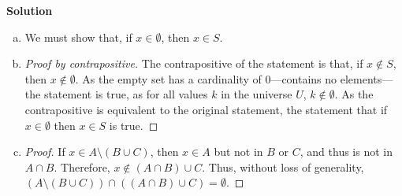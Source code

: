 \documentclass[11pt]{scrartcl}
\theoremstyle{dotlessP}
\theoremstyle{dotlessN}
\newcommand{\unite}{\cup}
\newcommand{\inter}{\cap}
\newcommand{\smin}{\setminus}
\begin{document}
\textbf{Solution}
\begin{enumerate}[a)]	
	\item We must show that, if $x \in \emptyset$, then  $x \in S$. 
	\item 
		\begin{proof}
			[Proof by contrapositive]
			The contrapositive of the statement is that, if $x \not\in S$, then $x \not\in \emptyset$. As the empty set has a cardinality of 0---contains no elements---the statement is true, as for all values $k$ in the universe $U$, $k \not\in \emptyset$. As the contrapositive is equivalent to the original statement, the statement that if $x \in \emptyset$ then  $x \in S$ is true.
		\end{proof}
	\item 
		\begin{proof}
			If $x \in A \smin (B \unite C)$, then $x \in A$ but not in $B$ or $C$, and thus is not in $A \inter B$. Therefore, $x \not\in (A \inter B) \unite C$. Thus, without loss of generality, $(A \smin (B \unite C)) \inter ((A \inter B) \unite C) = \emptyset$.
		\end{proof}
\end{enumerate}
\end{document}
